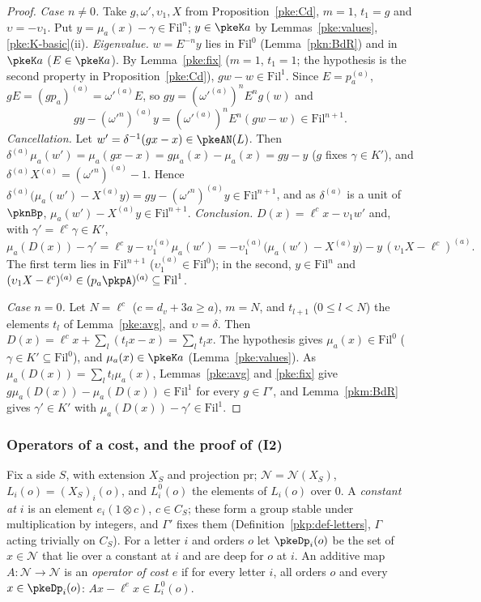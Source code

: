 \documentclass[10pt]{amsart}
\theoremstyle{definition}
\theoremstyle{remark}
\begin{document}
\begin{proof}
\emph{Case $n\ne0$.} Take $g,\omega',\upsilon_1,X$ from Proposition~\ref{pke:Cd}, $m=1$, $t_1=g$ and
$\upsilon=-\upsilon_1$. Put $y=\mu_a(x)-\gamma\in\mathrm{Fil}^n$; $y\in\pkeK a$ by Lemmas~\ref{pke:values},
\ref{pke:K-basic}(ii). \emph{Eigenvalue.} $w=E^{-n}y$ lies in $\mathrm{Fil}^0$ (Lemma~\ref{pkn:BdR}) and in
$\pkeK a$ ($E\in\pkeK a$). By Lemma~\ref{pke:fix} ($m=1$, $t_1=1$; the hypothesis is the second property in
Proposition~\ref{pke:Cd}), $gw-w\in\mathrm{Fil}^1$. Since $E=p_a^{(a)}$, $gE=(gp_a)^{(a)}=\omega'^{(a)}E$, so
$gy=(\omega'^{(a)})^nE^ng(w)$ and
\[
gy-(\omega'^n)^{(a)}y=(\omega'^{(a)})^nE^n(gw-w)\in\mathrm{Fil}^{n+1}.
\]
\emph{Cancellation.} Let $w'=\delta^{-1}(gx-x)\in\pkeAN(L)$. Then $\delta^{(a)}\mu_a(w')=\mu_a(gx-x)=g\mu_a(x)-
\mu_a(x)=gy-y$ ($g$ fixes $\gamma\in K'$), and $\delta^{(a)}X^{(a)}=(\omega'^n)^{(a)}-1$. Hence
$\delta^{(a)}\bigl(\mu_a(w')-X^{(a)}y\bigr)=gy-(\omega'^n)^{(a)}y\in\mathrm{Fil}^{n+1}$, and as $\delta^{(a)}$ is a
unit of $\pknBp$, $\mu_a(w')-X^{(a)}y\in\mathrm{Fil}^{n+1}$. \emph{Conclusion.} $D(x)=\ell^cx-\upsilon_1w'$ and,
with $\gamma'=\ell^c\gamma\in K'$,
\[
\mu_a(D(x))-\gamma'=\ell^cy-\upsilon_1^{(a)}\mu_a(w')=-\upsilon_1^{(a)}\bigl(\mu_a(w')-X^{(a)}y\bigr)-y\,
(\upsilon_1X-\ell^c)^{(a)} .
\]
The first term lies in $\mathrm{Fil}^{n+1}$ ($\upsilon_1^{(a)}\in\mathrm{Fil}^0$); in the second, $y\in
\mathrm{Fil}^n$ and $(\upsilon_1X-\ell^c)^{(a)}\in(p_a\pkpA)^{(a)}\subseteq\mathrm{Fil}^1$.

\emph{Case $n=0$.} Let $N=\ell^c$ ($c=d_v+3a\ge a$), $m=N$, and $t_{l+1}$ ($0\le l<N$) the elements $t_l$ of Lemma~\ref{pke:avg}, and
$\upsilon=\delta$. Then $D(x)=\ell^cx+\sum_l(t_lx-x)=\sum_lt_lx$. The hypothesis gives $\mu_a(x)\in\mathrm{Fil}^0$
($\gamma\in K'\subseteq\mathrm{Fil}^0$), and $\mu_a(x)\in\pkeK a$ (Lemma~\ref{pke:values}). As
$\mu_a(D(x))=\sum_lt_l\mu_a(x)$, Lemmas~\ref{pke:avg} and \ref{pke:fix} give $g\mu_a(D(x))-\mu_a(D(x))\in
\mathrm{Fil}^1$ for every $g\in\Gamma'$, and Lemma~\ref{pkm:BdR} gives $\gamma'\in K'$ with
$\mu_a(D(x))-\gamma'\in\mathrm{Fil}^1$.
\end{proof}

\subsubsection{Operators of a cost, and the proof of (I2)}\label{pke:ss-ops}

Fix a side $S$, with extension $X_S$ and projection $\mathrm{pr}$; $\mathcal N=\mathcal N(X_S)$, $L_i(o)=
(X_S)_i(o)$, and $L_i^0(o)$ the elements of $L_i(o)$ over $0$. A \emph{constant at $i$} is an element
$e_i(1\otimes c)$, $c\in C_S$; these form a group stable under multiplication by integers, and $\Gamma'$ fixes
them (Definition~\ref{pkp:def-letters}, $\Gamma$ acting trivially on $C_S$). For a letter $i$ and orders $o$ let
$\pkeDp_i(o)$ be the set of $x\in\mathcal N$ that lie over a constant at $i$ and are deep for $o$ at $i$. An
additive map $A\colon\mathcal N\to\mathcal N$ is an \emph{operator of cost $e$} if for every letter $i$, all
orders $o$ and every $x\in\pkeDp_i(o)$: $Ax-\ell^ex\in L_i^0(o)$.
\end{document}
